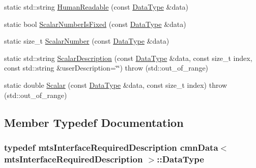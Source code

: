 \begin{DoxyCompactItemize}
\item 
static std\-::string \hyperlink{classcmn_data_3_01mts_interface_required_description_01_4_a81c18ef737c42a17d0c569362c30596d}{Human\-Readable} (const \hyperlink{classcmn_data_3_01mts_interface_required_description_01_4_aa335fadfd965b6b92ab7fa93b18c547d}{Data\-Type} \&data)
\item 
static bool \hyperlink{classcmn_data_3_01mts_interface_required_description_01_4_ad65b6165eca0da3652f0bf05d1393f1e}{Scalar\-Number\-Is\-Fixed} (const \hyperlink{classcmn_data_3_01mts_interface_required_description_01_4_aa335fadfd965b6b92ab7fa93b18c547d}{Data\-Type} \&data)
\item 
static size\-\_\-t \hyperlink{classcmn_data_3_01mts_interface_required_description_01_4_a3ba518cbea4c71bba4dda7c3df7638ce}{Scalar\-Number} (const \hyperlink{classcmn_data_3_01mts_interface_required_description_01_4_aa335fadfd965b6b92ab7fa93b18c547d}{Data\-Type} \&data)
\item 
static std\-::string \hyperlink{classcmn_data_3_01mts_interface_required_description_01_4_a154018c7dfb8b988c49513b8473b02fe}{Scalar\-Description} (const \hyperlink{classcmn_data_3_01mts_interface_required_description_01_4_aa335fadfd965b6b92ab7fa93b18c547d}{Data\-Type} \&data, const size\-\_\-t index, const std\-::string \&user\-Description=\char`\"{}\char`\"{})  throw (std\-::out\-\_\-of\-\_\-range)
\item 
static double \hyperlink{classcmn_data_3_01mts_interface_required_description_01_4_a238469398ea97dc71f91b498222fcc49}{Scalar} (const \hyperlink{classcmn_data_3_01mts_interface_required_description_01_4_aa335fadfd965b6b92ab7fa93b18c547d}{Data\-Type} \&data, const size\-\_\-t index)  throw (std\-::out\-\_\-of\-\_\-range)
\end{DoxyCompactItemize}


\subsection{Member Typedef Documentation}
\hypertarget{classcmn_data_3_01mts_interface_required_description_01_4_aa335fadfd965b6b92ab7fa93b18c547d}{
\subsubsection[{Data\-Type}]{\setlength{\rightskip}{0pt plus 5cm}typedef {\bf mts\-Interface\-Required\-Description} {\bf cmn\-Data}$<$ {\bf mts\-Interface\-Required\-Description} $>$\-::{\bf Data\-Type}}}\label{classcmn_data_3_01mts_interface_required_description_01_4_aa335fadfd965b6b92ab7fa93b18c547d}


